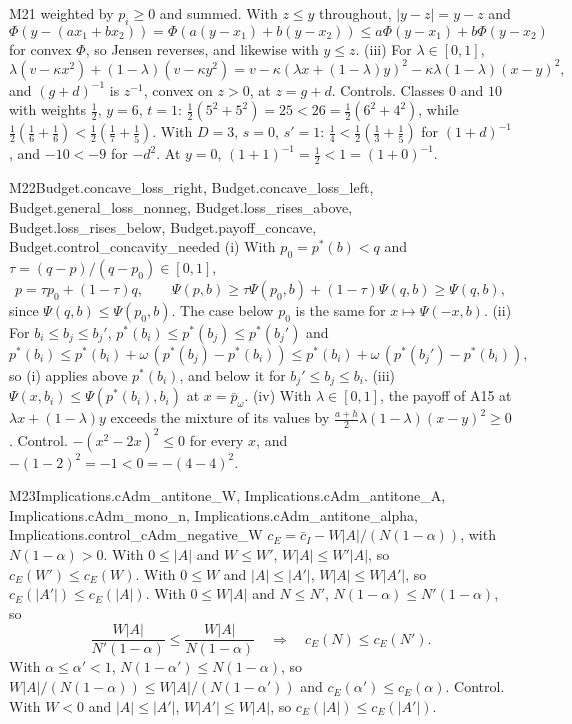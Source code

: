 \begin{mproof}{M21}
weighted by $p_i\ge0$ and summed. With $z\le y$ throughout,
$|y-z|=y-z$ and
\[
\Phi(y-(ax_1+bx_2))=\Phi(a(y-x_1)+b(y-x_2))\le a\Phi(y-x_1)+b\Phi(y-x_2)
\]
for convex $\Phi$, so Jensen reverses, and likewise with $y\le z$.
(iii) For $\lambda\in[0,1]$,
\[
\lambda(v-\kappa x^2)+(1-\lambda)(v-\kappa y^2)
=v-\kappa(\lambda x+(1-\lambda)y)^2-\kappa\lambda(1-\lambda)(x-y)^2 ,
\]
and $(g+d)^{-1}$ is $z^{-1}$, convex on $z>0$, at $z=g+d$.
Controls. Classes $0$ and $10$ with weights $\tfrac12$, $y=6$, $t=1$:
$\tfrac12(5^2+5^2)=25<26=\tfrac12(6^2+4^2)$, while
$\tfrac12(\tfrac16+\tfrac16)<\tfrac12(\tfrac17+\tfrac15)$. With $D=3$, $s=0$,
$s'=1$: $\tfrac14<\tfrac12(\tfrac13+\tfrac15)$ for $(1+d)^{-1}$, and
$-10<-9$ for $-d^2$. At $y=0$, $(1+1)^{-1}=\tfrac12<1=(1+0)^{-1}$.
\end{mproof}
\begin{mproof}{M22}{Budget.concave_loss_right, Budget.concave_loss_left, Budget.general_loss_nonneg, Budget.loss_rises_above, Budget.loss_rises_below, Budget.payoff_concave, Budget.control_concavity_needed}
(i) With $p_0=p^*(b)<q$ and $\tau=(q-p)/(q-p_0)\in[0,1]$,
\[
p=\tau p_0+(1-\tau)q,\qquad
\Psi(p,b)\ge\tau\Psi(p_0,b)+(1-\tau)\Psi(q,b)\ge\Psi(q,b),
\]
since $\Psi(q,b)\le\Psi(p_0,b)$. The case below $p_0$ is the same for
$x\mapsto\Psi(-x,b)$.
(ii) For $b_i\le b_j\le b_j'$, $p^*(b_i)\le p^*(b_j)\le p^*(b_j')$ and
\[
p^*(b_i)\le p^*(b_i)+\omega\,(p^*(b_j)-p^*(b_i))\le
p^*(b_i)+\omega\,(p^*(b_j')-p^*(b_i)),
\]
so (i) applies above $p^*(b_i)$, and below it for $b_j'\le b_j\le b_i$.
(iii) $\Psi(x,b_i)\le\Psi(p^*(b_i),b_i)$ at $x=\bar p_\omega$.
(iv) With $\lambda\in[0,1]$, the payoff of A15 at
$\lambda x+(1-\lambda)y$ exceeds the mixture of its values by
$\tfrac{a+h}{2}\lambda(1-\lambda)(x-y)^2\ge0$.
Control. $-(x^2-2x)^2\le0$ for every $x$, and
$-(1-2)^2=-1<0=-(4-4)^2$.
\end{mproof}

\begin{mproof}{M23}{Implications.cAdm_antitone_W, Implications.cAdm_antitone_A, Implications.cAdm_mono_n, Implications.cAdm_antitone_alpha, Implications.control_cAdm_negative_W}
$c_E=\bar c_I-W|A|/(N(1-\alpha))$, with $N(1-\alpha)>0$. With $0\le|A|$ and
$W\le W'$, $W|A|\le W'|A|$, so $c_E(W')\le c_E(W)$. With $0\le W$ and
$|A|\le|A'|$, $W|A|\le W|A'|$, so $c_E(|A'|)\le c_E(|A|)$. With $0\le W|A|$
and $N\le N'$, $N(1-\alpha)\le N'(1-\alpha)$, so
\[
\frac{W|A|}{N'(1-\alpha)}\le\frac{W|A|}{N(1-\alpha)}
\quad\Longrightarrow\quad c_E(N)\le c_E(N').
\]
With $\alpha\le\alpha'<1$, $N(1-\alpha')\le N(1-\alpha)$, so
$W|A|/(N(1-\alpha))\le W|A|/(N(1-\alpha'))$ and $c_E(\alpha')\le c_E(\alpha)$.
Control. With $W<0$ and $|A|\le|A'|$, $W|A'|\le W|A|$, so
$c_E(|A|)\le c_E(|A'|)$.
\end{mproof}

